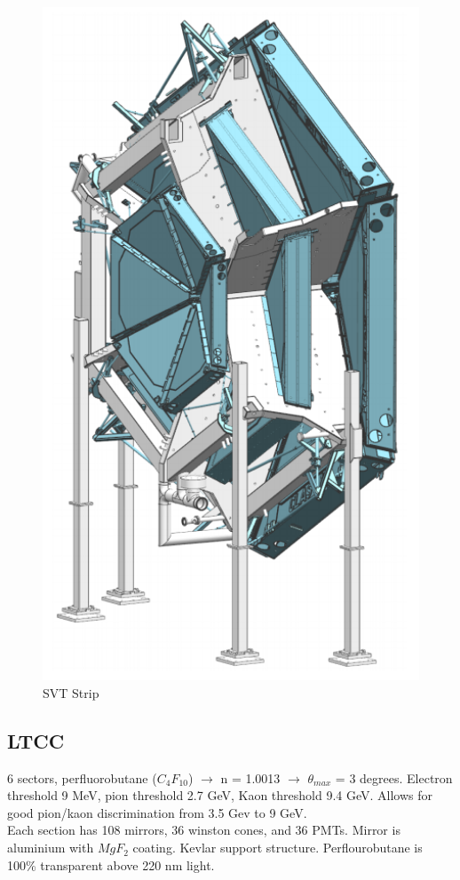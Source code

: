             									
			 \begin{figure}[H]
    			\centering
    			\includegraphics[width=12cm]{CLAS-12/modules/clas-12-system/pics/fd/drift-chambers.PNG}
    			\caption{SVT Strip}
			\end{figure}    

            
        \subsection{LTCC}
            6 sectors, perfluorobutane ($C_4F_10$) $\longrightarrow$ n = 1.0013 $\longrightarrow$ $\theta_{max}$ = 3 degrees. Electron threshold 9 MeV, pion threshold 2.7 GeV, Kaon threshold 9.4 GeV. Allows for good pion/kaon discrimination from 3.5 Gev to 9 GeV. \\
            Each section has 108 mirrors, 36 winston cones, and 36 PMTs. Mirror is aluminium with $MgF_2$ coating. Kevlar support structure. Perflourobutane is 100\% transparent above 220 nm light. 
            
